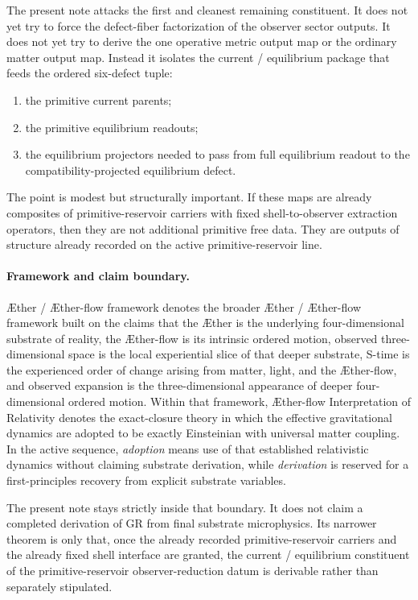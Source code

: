 \documentclass[11pt]{article}
\newcommand{\Aether}{\AE{}ther}
\newcommand{\Aflow}{\AE{}ther-flow}
\newcommand{\TheoryName}{\Aflow{} Interpretation of Relativity}
\newcommand{\TheoryProgram}{\Aether{} / \Aflow{} framework}
\begin{document}
The present note attacks the first and cleanest remaining constituent. It does not yet try to force the defect-fiber factorization of the observer sector outputs. It does not yet try to derive the one operative metric output map or the ordinary matter output map. Instead it isolates the current / equilibrium package that feeds the ordered six-defect tuple:
\begin{enumerate}
    \item the primitive current parents;
    \item the primitive equilibrium readouts;
    \item the equilibrium projectors needed to pass from full equilibrium readout to the compatibility-projected equilibrium defect.
\end{enumerate}
The point is modest but structurally important. If these maps are already composites of primitive-reservoir carriers with fixed shell-to-observer extraction operators, then they are not additional primitive free data. They are outputs of structure already recorded on the active primitive-reservoir line.

\paragraph{Framework and claim boundary.}
\TheoryProgram{} denotes the broader \Aether{} / \Aflow{} framework built on the claims that the \Aether{} is the underlying four-dimensional substrate of reality, the \Aflow{} is its intrinsic ordered motion, observed three-dimensional space is the local experiential slice of that deeper substrate, S-time is the experienced order of change arising from matter, light, and the \Aflow{}, and observed expansion is the three-dimensional appearance of deeper four-dimensional ordered motion. Within that framework, \TheoryName{} denotes the exact-closure theory in which the effective gravitational dynamics are adopted to be exactly Einsteinian with universal matter coupling. In the active sequence, \emph{adoption} means use of that established relativistic dynamics without claiming substrate derivation, while \emph{derivation} is reserved for a first-principles recovery from explicit substrate variables.

The present note stays strictly inside that boundary. It does not claim a completed derivation of GR from final substrate microphysics. Its narrower theorem is only that, once the already recorded primitive-reservoir carriers and the already fixed shell interface are granted, the current / equilibrium constituent of the primitive-reservoir observer-reduction datum is derivable rather than separately stipulated.
\end{document}
